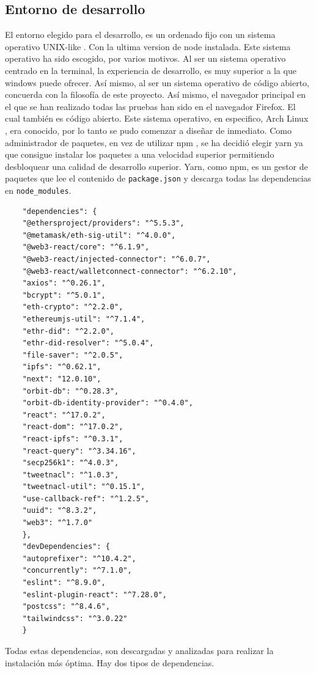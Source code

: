 \subsection{Entorno de desarrollo}
El entorno elegido para el desarrollo, es un ordenado fijo con un sistema operativo UNIX-like \cite{web:unix-like}. Con la ultima version de node instalada. Este sistema operativo ha sido escogido, por varios motivos. Al ser un sistema operativo centrado en la terminal, la experiencia de desarrollo, es muy superior a la que windows puede ofrecer. Así mismo, al ser un sistema operativo de código abierto, concuerda con la filosofía de este proyecto.
Así mismo, el navegador principal en el que se han realizado todas las pruebas han sido en el navegador Firefox. El cual también es código abierto.
Este sistema operativo, en especifico, Arch Linux \cite{web:arch}, era conocido, por lo tanto se pudo comenzar a diseñar de inmediato.
Como administrador de paquetes, en vez de utilizar npm \cite{web:npm}, se ha decidió elegir yarn ya que consigue instalar los paquetes a una velocidad superior permitiendo desbloquear una calidad de desarrollo superior. Yarn, como npm, es un gestor de paquetes que lee el contenido de \verb|package.json| y descarga todas las dependencias en \verb|node_modules|.
\begin{lstlisting}
    "dependencies": {
	"@ethersproject/providers": "^5.5.3",
    "@metamask/eth-sig-util": "^4.0.0",
    "@web3-react/core": "^6.1.9",
    "@web3-react/injected-connector": "^6.0.7",
    "@web3-react/walletconnect-connector": "^6.2.10",
    "axios": "^0.26.1",
    "bcrypt": "^5.0.1",
    "eth-crypto": "^2.2.0",
    "ethereumjs-util": "^7.1.4",
    "ethr-did": "^2.2.0",
    "ethr-did-resolver": "^5.0.4",
    "file-saver": "^2.0.5",
    "ipfs": "^0.62.1",
    "next": "12.0.10",
    "orbit-db": "^0.28.3",
    "orbit-db-identity-provider": "^0.4.0",
    "react": "^17.0.2",
    "react-dom": "^17.0.2",
    "react-ipfs": "^0.3.1",
    "react-query": "^3.34.16",
    "secp256k1": "^4.0.3",
    "tweetnacl": "^1.0.3",
    "tweetnacl-util": "^0.15.1",
    "use-callback-ref": "^1.2.5",
    "uuid": "^8.3.2",
    "web3": "^1.7.0"
    },
    "devDependencies": {
    "autoprefixer": "^10.4.2",
    "concurrently": "^7.1.0",
    "eslint": "^8.9.0",
    "eslint-plugin-react": "^7.28.0",
    "postcss": "^8.4.6",
    "tailwindcss": "^3.0.22"
    }
\end{lstlisting}
Todas estas dependencias, son descargadas y analizadas para realizar la instalación más óptima.
Hay dos tipos de dependencias.
